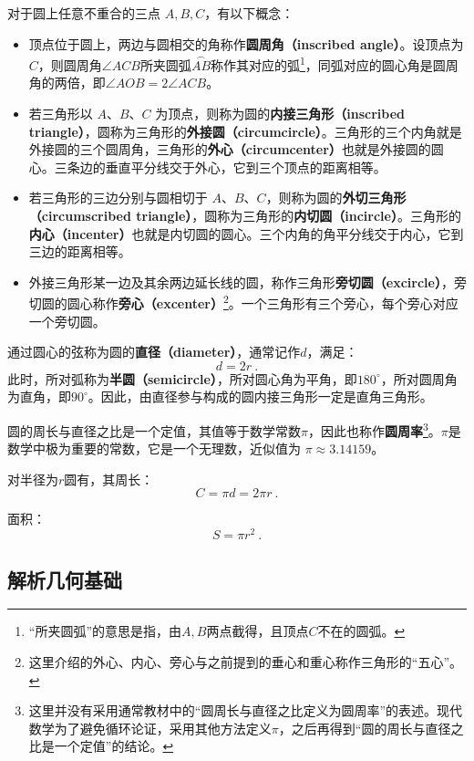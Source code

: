 对于圆上任意不重合的三点 $A,B,C$，有以下概念：
\begin{itemize}
\item 顶点位于圆上，两边与圆相交的角称作\textbf{圆周角（inscribed angle）}。设顶点为$C$，则圆周角$\angle ACB$所夹圆弧$\overset{\frown}{AB}$称作其对应的弧\footnote{“所夹圆弧”的意思是指，由$A,B$两点截得，且顶点$C$不在的圆弧。}，同弧对应的圆心角是圆周角的两倍，即$\angle AOB=2\angle ACB$。
\item 若三角形以 $A$、$B$、$C$ 为顶点，则称为圆的\textbf{内接三角形（inscribed triangle）}，圆称为三角形的\textbf{外接圆（circumcircle）}。三角形的三个内角就是外接圆的三个圆周角，三角形的\textbf{外心（circumcenter）}也就是外接圆的圆心。三条边的垂直平分线交于外心，它到三个顶点的距离相等。
\item 若三角形的三边分别与圆相切于 $A$、$B$、$C$，则称为圆的\textbf{外切三角形（circumscribed triangle）}，圆称为三角形的\textbf{内切圆（incircle）}。三角形的\textbf{内心（incenter）}也就是内切圆的圆心。三个内角的角平分线交于内心，它到三边的距离相等。
\item 外接三角形某一边及其余两边延长线的圆，称作三角形\textbf{旁切圆（excircle）}，旁切圆的圆心称作\textbf{旁心（excenter）}\footnote{这里介绍的外心、内心、旁心与之前提到的垂心和重心称作三角形的“五心”。}。一个三角形有三个旁心，每个旁心对应一个旁切圆。
\end{itemize}

通过圆心的弦称为圆的\textbf{直径（diameter）}，通常记作$d$，满足：
\begin{equation}
d = 2r~.
\end{equation}
此时，所对弧称为\textbf{半圆（semicircle）}，所对圆心角为平角，即$180^\circ$，所对圆周角为直角，即$90^\circ$。因此，由直径参与构成的圆内接三角形一定是直角三角形。

圆的周长与直径之比是一个定值，其值等于数学常数$\pi$，因此也称作\textbf{圆周率}\footnote{这里并没有采用通常教材中的“圆周长与直径之比定义为圆周率”的表述。现代数学为了避免循环论证，采用其他方法定义$\pi$，之后再得到“圆的周长与直径之比是一个定值”的结论。}。$\pi$是数学中极为重要的常数，它是一个无理数，近似值为 $\pi \approx 3.14159$。

对半径为$r$圆有，其周长：
\begin{equation}
C = \pi d=2 \pi r~. 
\end{equation}

面积：
\begin{equation}
S = \pi r^2~.
\end{equation}


\subsection{解析几何基础}

